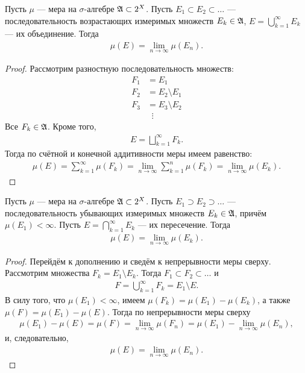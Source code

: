 \begin{claim}
 \label{claim:upward_continuity_of_measure}
 Пусть $\mu$ --- мера на $\sigma$-алгебре $\mathfrak{A} \subset 2^{X}$. Пусть  $E_1 \subset E_2 \subset \ldots$  --- последовательность возрастающих измеримых множеств $E_k \in \mathfrak{A}$, $E = \bigcup_{k=1}^{\infty} E_k$  --- их объединение. Тогда
 \begin{align*}
  \mu(E) = \lim_{n \to \infty} \mu(E_n) 
 .\end{align*} 
\end{claim}
\begin{proof}
 Рассмотрим разностную последовательность множеств:
 \begin{align*}
  F_1 &= E_1 \\
  F_2 &= E_2 \setminus E_1 \\
  F_3 &= E_3 \setminus E_2 \\
  &\;\;\vdots
 \end{align*} Все $F_k \in \mathfrak{A}$. Кроме того,
 \begin{align*}
  E = \bigsqcup_{k=1}^{\infty} F_k
 .\end{align*} Тогда по счётной и конечной аддитивности меры имеем равенство:
 \begin{align*}
  \mu(E) = \sum_{k=1}^{\infty} \mu(F_k) = \lim_{n \to \infty} \sum_{k=1}^{n} \mu(F_k) = \lim_{n \to \infty} \mu(E_k)  
 .\end{align*}
\end{proof}
\begin{claim}
 \label{claim:downward_continuity_of_measure}
 Пусть $\mu$ --- мера на $\sigma$-алгебре $\mathfrak{A} \subset 2^{X}$. Пусть $E_1 \supset E_2 \supset \ldots $ --- последовательность убывающих измеримых множеств $E_k \in \mathfrak{A}$, причём $\mu(E_1) < \infty$. Пусть $E = \bigcap_{k=1}^{\infty} E_k$  --- их пересечение. Тогда
 \begin{align*}
  \mu(E) = \lim_{n \to \infty} \mu(E_k) 
 .\end{align*} 
\end{claim}
\begin{proof}
 Перейдём к дополнению и сведём к непрерывности меры сверху. Рассмотрим множества $F_k = E_1 \setminus E_k$. Тогда $F_1 \subset F_2 \subset \ldots$ и 
 \begin{align*}
  F = \bigcup_{k=1}^{\infty} F_k = E_1 \setminus E
 .\end{align*} В силу того, что $\mu(E_1) < \infty$, имеем $\mu(F_k) = \mu(E_1) - \mu(E_k)$, а также $\mu(F) = \mu(E_1) - \mu(E)$. Тогда по непрерывности меры сверху
 \begin{align*}
  \mu(E_1) - \mu(E) = \mu(F) = \lim_{n \to \infty} \mu(F_n)  = \mu(E_1) - \lim_{n \to \infty} \mu(E_n) 
 ,\end{align*} и, следовательно,
 \begin{align*}
  \mu(E) = \lim_{n \to \infty} \mu(E_n) 
 .\end{align*} 
\end{proof}

